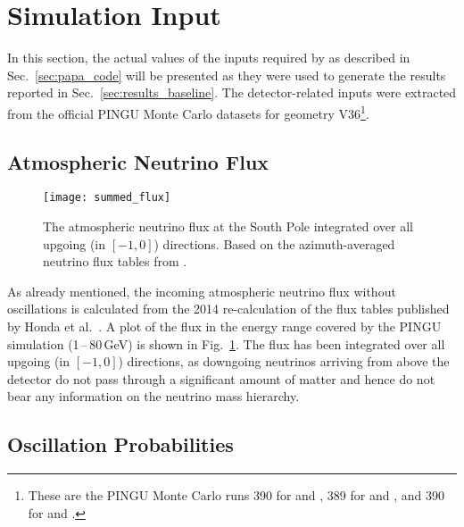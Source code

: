 \section{Simulation Input}
\label{sec:sim_input}

In this section, the actual values of the inputs required by \papa as described
in Sec.~\ref{sec:papa_code} will be presented as they were used to generate the
results reported in Sec.~\ref{sec:results_baseline}. The detector-related
inputs were extracted from the official PINGU Monte Carlo datasets for geometry
V36\footnote{These are the PINGU Monte Carlo runs 390 for \nue and \nuebar, 389
for \numu and \numubar, and 390 for \nutau and \nutaubar.}.

\subsection{Atmospheric Neutrino Flux}
\label{sec:input_flux}

\begin{figure}[htbp]
 \centering
 \texttt{[image: summed\_flux]}
 \caption{The atmospheric neutrino flux at the South Pole integrated over all
          upgoing (\coszen in $[-1,0]$) directions. Based on the
          azimuth-averaged neutrino flux tables from \cite{HondaSP}.}
\label{fig:summed_flux}
\end{figure}

As already mentioned, the incoming atmospheric neutrino flux without
oscillations is calculated from the 2014 re-calculation of the flux tables
published by Honda et al.\ \cite{Honda, HondaSP}. A plot of the flux in the
energy range covered by the PINGU simulation (1\,--\,80\,GeV) is shown in
Fig.~\ref{fig:summed_flux}. The flux has been integrated over all upgoing
(\coszen in $[-1,0]$) directions, as downgoing neutrinos arriving from above
the detector do not pass through a significant amount of matter and hence do
not bear any information on the neutrino mass hierarchy.

\subsection{Oscillation Probabilities}
\label{sec:input_osc}

